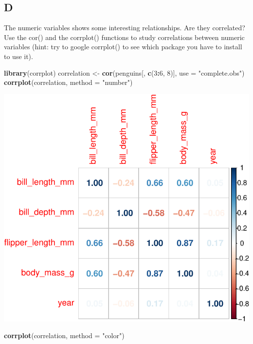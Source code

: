 \documentclass[
]{article}
\newenvironment{Shaded}{\begin{snugshade}}{\end{snugshade}}
\newcommand{\DataTypeTok}[1]{\textcolor[rgb]{0.13,0.29,0.53}{#1}}
\newcommand{\DecValTok}[1]{\textcolor[rgb]{0.00,0.00,0.81}{#1}}
\newcommand{\KeywordTok}[1]{\textcolor[rgb]{0.13,0.29,0.53}{\textbf{#1}}}
\newcommand{\NormalTok}[1]{#1}
\newcommand{\OperatorTok}[1]{\textcolor[rgb]{0.81,0.36,0.00}{\textbf{#1}}}
\newcommand{\StringTok}[1]{\textcolor[rgb]{0.31,0.60,0.02}{#1}}
\begin{document}
\hypertarget{d-3}{%
\subsection{D}\label{d-3}}

The numeric variables shows some interesting relationships. Are they
correlated? Use the cor() and the corrplot() functions to study
correlations between numeric variables (hint: try to google corrplot()
to see which package you have to install to use it).

\begin{Shaded}
\begin{Highlighting}[]
\KeywordTok{library}\NormalTok{(corrplot)}
\NormalTok{correlation \textless{}{-}}\StringTok{ }\KeywordTok{cor}\NormalTok{(penguins[, }\KeywordTok{c}\NormalTok{(}\DecValTok{3}\OperatorTok{:}\DecValTok{6}\NormalTok{, }\DecValTok{8}\NormalTok{)], }\DataTypeTok{use =} \StringTok{"complete.obs"}\NormalTok{)}
\KeywordTok{corrplot}\NormalTok{(correlation, }\DataTypeTok{method =} \StringTok{"number"}\NormalTok{)}
\end{Highlighting}
\end{Shaded}

\includegraphics{es_files/figure-latex/unnamed-chunk-20-1.pdf}

\begin{Shaded}
\begin{Highlighting}[]
\KeywordTok{corrplot}\NormalTok{(correlation, }\DataTypeTok{method =} \StringTok{"color"}\NormalTok{)}
\end{Highlighting}
\end{Shaded}
\end{document}
